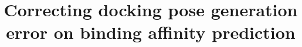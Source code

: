 \documentclass[twocolumn]{bmcart}
\begin{document}
\begin{frontmatter}

\begin{fmbox}


\title{Correcting docking pose generation error on binding affinity prediction}


\author[
   addressref={aff1},                   %
   email={jackyleehongjian@gmail.com}   %
]{ }
\author[
   addressref={aff1},                   %
   email={ksleung@cse.cuhk.edu.hk}
]{ }
\author[
   addressref={aff1},                   %
   email={mhwong@cse.cuhk.edu.hk}
]{ }
\author[
   addressref={aff2},
   corref={aff2},                      %
   email={pedro.ballester@inserm.fr}
]{ }



\end{fmbox}
\end{frontmatter}
\end{document}
